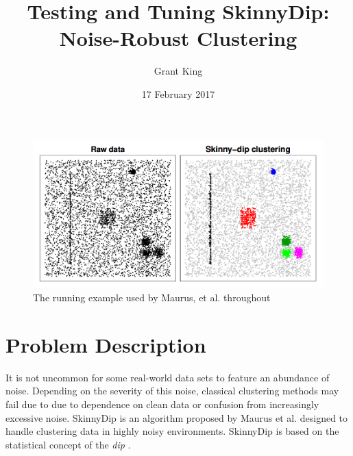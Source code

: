 \documentclass{sig-alternate-05-2015}
\begin{document}


\title{Testing and Tuning SkinnyDip: Noise-Robust Clustering}
\author{
%
%
\alignauthor
Grant King\\
}
\date{17 February 2017}

\maketitle

\begin{figure}[t]
\centering
\includegraphics[width=\textwidth]{images/SkinnyDipExample}
\caption{The running example used by Maurus, et al. throughout \cite{skinnydip}}
\label{fig:algor}
\end{figure}

\section{Problem Description}
It is not uncommon for some real-world data sets to feature an abundance of noise. Depending on the severity of this noise, classical clustering methods may fail due to due to dependence on clean data or confusion from increasingly excessive noise. SkinnyDip is an algorithm proposed by Maurus et al.\cite{skinnydip} designed to handle clustering data in highly noisy environments. SkinnyDip is based on the statistical concept of the \textit{dip} \cite{dip}. 
\end{document}
